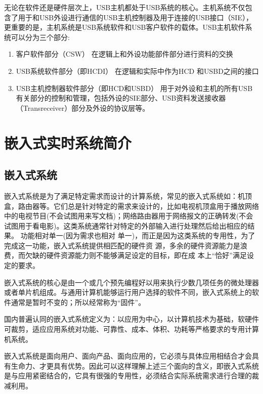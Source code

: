 无论在软件还是硬件层次上，USB主机都处于USB系统的核心。主机系统不仅包含了用于和USB外设进行通信的USB主机控制器及用于连接的USB接口（SIE），更重要的是，主机系统是USB系统软件和USB客户软件的载体。USB主机软件系统可以分为三个部分:
\begin{enumerate}
\item 客户软件部分（CSW）
在逻辑上和外设功能部件部分进行资料的交换

\item USB系统软件部分（即HCDI）
在逻辑和实际中作为HCD 和USBD之间的接口

\item USB主机控制器软件部分（即HCD和USBD）
用于对外设和主机的所有USB有关部分的控制和管理，包括外设的SIE部分、USB资料发送接收器（Transreceiver）部分及外设的协议层等。
\end{enumerate}

\section{嵌入式实时系统简介}

\subsection{嵌入式系统}
嵌入式系统是为了满足特定需求而设计的计算系统，常见的嵌入式系统如：机顶盒，路由器等。它们总是针对特定的需求来设计的，比如电视机顶盒用于播放网络中的电视节目(不会试图用来写文档)；网络路由器用于网络报文的正确转发(不会试图用于看电影)。这类系统通常针对特定的外部输入进行处理然后给出相应的结果。 功能相对单一(因为需求也相对
单一)，而正是因为这类系统的专用性，为了完成这一功能，嵌入式系统提供相匹配的硬件资
源，多余的硬件资源能力是浪费，而欠缺的硬件资源能力则不能够满足设定的目标，即在成
本上“恰好”满足设定的要求。

嵌入式系统的核心是由一个或几个预先编程好以用来执行少数几项任务的微处理器或者单片机组成。与通用计算机能够运行用户选择的软件不同，嵌入式系统上的软件通常是暂时不变的；所以经常称为“固件”。

国内普遍认同的嵌入式系统定义为：以应用为中心，以计算机技术为基础，软硬件可裁剪，适应应用系统对功能、可靠性、成本、体积、功耗等严格要求的专用计算机系统。

嵌入式系统是面向用户、面向产品、面向应用的，它必须与具体应用相结合才会具有生命力、才更具有优势。因此可以这样理解上述三个面向的含义，即嵌入式系统是与应用紧密结合的，它具有很强的专用性，必须结合实际系统需求进行合理的裁减利用。
